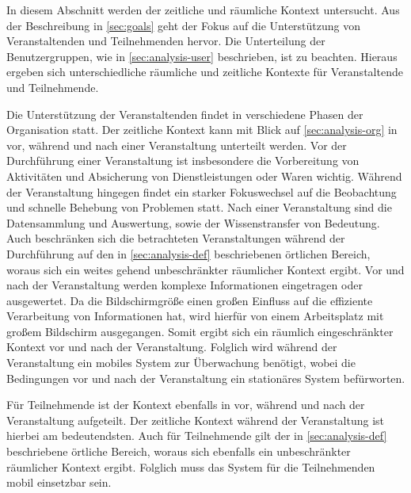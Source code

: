 In diesem Abschnitt werden der zeitliche und räumliche Kontext untersucht. Aus
der Beschreibung in \autoref{sec:goals} geht der Fokus auf die Unterstützung von
Veranstaltenden und Teilnehmenden hervor. Die Unterteilung der Benutzergruppen,
wie in \autoref{sec:analysis-user} beschrieben, ist zu beachten. Hieraus ergeben
sich unterschiedliche räumliche und zeitliche Kontexte für Veranstaltende und
Teilnehmende.

Die Unterstützung der Veranstaltenden findet in verschiedene Phasen der
Organisation statt. Der zeitliche Kontext kann mit Blick auf
\autoref{sec:analysis-org} in vor, während und nach einer Veranstaltung
unterteilt werden. Vor der Durchführung einer Veranstaltung ist insbesondere die
Vorbereitung von Aktivitäten und Absicherung von Dienstleistungen oder Waren
wichtig. Während der Veranstaltung hingegen findet ein starker Fokuswechsel auf
die Beobachtung und schnelle Behebung von Problemen statt. Nach einer
Veranstaltung sind die Datensammlung und Auswertung, sowie der Wissenstransfer
von Bedeutung. \\
Auch beschränken sich die betrachteten Veranstaltungen während der Durchführung
auf den in \autoref{sec:analysis-def} beschriebenen örtlichen Bereich, woraus
sich ein weites gehend unbeschränkter räumlicher Kontext ergibt. Vor und nach
der Veranstaltung werden komplexe Informationen eingetragen oder ausgewertet. Da
die Bildschirmgröße einen großen Einfluss auf die effiziente Verarbeitung von
Informationen hat, wird hierfür von einem Arbeitsplatz mit großem Bildschirm
ausgegangen. Somit ergibt sich ein räumlich eingeschränkter Kontext vor und nach
der Veranstaltung. Folglich wird während der Veranstaltung ein mobiles System
zur Überwachung benötigt, wobei die Bedingungen vor und nach der Veranstaltung
ein stationäres System befürworten.

Für Teilnehmende ist der Kontext ebenfalls in vor, während und nach der
Veranstaltung aufgeteilt. Der zeitliche Kontext während der Veranstaltung ist
hierbei am bedeutendsten. Auch für Teilnehmende gilt der in
\autoref{sec:analysis-def} beschriebene örtliche Bereich, woraus sich ebenfalls
ein unbeschränkter räumlicher Kontext ergibt. Folglich muss das System für die
Teilnehmenden mobil einsetzbar sein.



